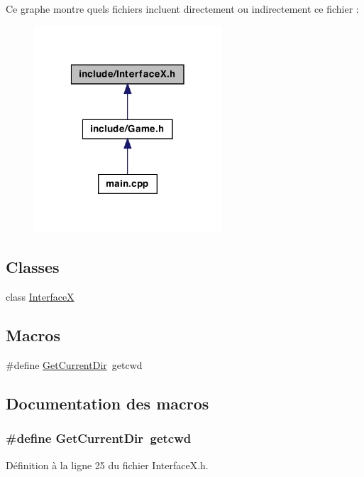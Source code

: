 Ce graphe montre quels fichiers incluent directement ou indirectement ce fichier :
\nopagebreak
\begin{figure}[H]
\begin{center}
\leavevmode
\includegraphics[width=198pt]{a00059}
\end{center}
\end{figure}
\subsection*{Classes}
\begin{DoxyCompactItemize}
\item 
class \hyperlink{a00011}{InterfaceX}
\end{DoxyCompactItemize}
\subsection*{Macros}
\begin{DoxyCompactItemize}
\item 
\#define \hyperlink{a00028_af0c0d1034a71f8aa3a08cda83c9d4e7a}{GetCurrentDir}~getcwd
\end{DoxyCompactItemize}


\subsection{Documentation des macros}
\hypertarget{a00028_af0c0d1034a71f8aa3a08cda83c9d4e7a}{
\subsubsection[{GetCurrentDir}]{\setlength{\rightskip}{0pt plus 5cm}\#define GetCurrentDir~getcwd}}
\label{a00028_af0c0d1034a71f8aa3a08cda83c9d4e7a}


Définition à la ligne 25 du fichier InterfaceX.h.

